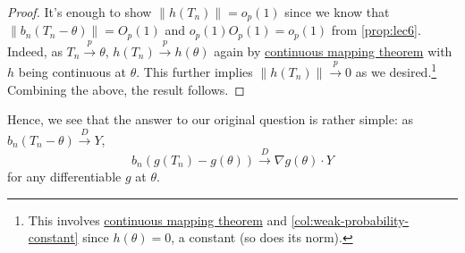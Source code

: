 \begin{proof}
	It's enough to show \(\lVert h(T_n) \rVert = o_p(1)\) since we know that \(\lVert b_n (T_n - \theta ) \rVert = O_p(1)\) and \(o_p(1) O_p(1) = o_p(1)\) from \autoref{prop:lec6}. Indeed, as \(T_n \overset{p}{\to } \theta \), \(h(T_n) \overset{p}{\to } h(\theta )\) again by \hyperref[thm:continuous-mapping]{continuous mapping theorem} with \(h\) being continuous at \(\theta \). This further implies \(\lVert h(T_n) \rVert \overset{p}{\to } 0\) as we desired.\footnote{This involves \hyperref[thm:continuous-mapping]{continuous mapping theorem} and \autoref{col:weak-probability-constant} since \(h(\theta ) = 0\), a constant (so does its norm).} Combining the above, the result follows.
\end{proof}

Hence, we see that the answer to our original question is rather simple: as \(b_n(T_n - \theta ) \overset{D}{\to } Y\),
\[
	b_n(g(T_n) - g(\theta )) \overset{D}{\to } \nabla g(\theta ) \cdot Y
\]
for any differentiable \(g\) at \(\theta \).